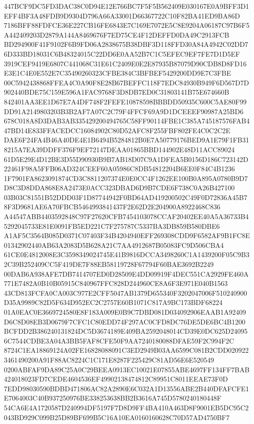 \documentclass[UTF8,fontset=fandol,zihao=-4,a4paper]{ctexart}
\begin{document}
{{447BCF9DC5FD3DAC38C0D94E12E766BC7F5F5B562409E030167E0A9BFF3D1EFF4BF3A48FDB9D9304D796A66A33001D66367722C10F82BA41ED9BA86D
7186BFF88FDFCE36E227CB16FE6843E7C169E7072E5C8E9204A06187C97B6F5A442409203D2879A144A8469676F7ED75CE4F12DEFFD0DA49C2913FCB
BD294900F41F9102F6B9FD06A2838675B38DBF3D118FFD30A84A4942C02DD76D333BD18031C6B48324015C22DD6E0AA52B7C1C5EFEC9EF7FE7D1D5EF
3919CEF9419E6807C441068C31E61C2409E0E2E87935B87079D90CDB8D8FD16E3E1C4E0E552E7C35490260323CFBE384C3BFBEF5429200DD9E7C3FBE
00C5942438868FFEA4C0A90F8E28B67BEFFC118F7EDC84930B949F6D567D7D902440BDE75C159E596A1FAC9768F3D8DB7ED0C31803141B75E674660B
842401AA3EE1D67E7A4DF748F2FEFE10878598BBBDD50935C600C5AE80F99DD91A2149803203B3B2AF7A07C2C79F4FFCF69A9D1DCEEEF90987A25BD6
678C018A8D3DAB3AB335429200494765C58FF90114FBE1C385A745187576FAB447BD14E833FFACEDCC16084902C80D52AFC8F255FBF802FE4C0C2C2E
DAE6F24FA4B46A40DE4E1B6494B5284812B0E7A50779176BED9A1E79F1FB318215A7EA39DDFF376F9EF72147DEAA01865BBD144902E48D11ACC89024
61D5E29E4D12BE3D55D90930B9B7AB18D07C9A1DFEA5B0156D186C723142D22461F98A5FFB06AD324CEEF60A05986C8DB54812204B6EE0F84C4B1236
1F7901FA8623091874CD3C8811207374E0E0CC4F1262EE100B0A895A0780B9D7D8C3D8DDA868E8A2473E0ACC323DBAD6D9B7CDE6F738C0A26B427100
03B03C81551B52DDD03F1D87744942F0BD64AD419200502C49F0D72836A45B78F3D9681AE6A70FBCB5464993841437F2E62D2E204900A8922468C836
A44547ABB4403592848C97F27620CFB7454103078CCAF20402EE40A5A36733B45292045733E81E0091FB5ED221C7F275787C5337BA3DB859B580DBE6
A1AF5C3564B085D0371C07403F34B4204940EFF269308CDD9F6582AF9B1FC8E01342902440AB63A2083D5B628A21C7AA4912687B05083FC9D506CBA4
61CE0E4812008E3C3598349024745E41B9816DCCA3498260C1A1439200F05C9B32C39B252409CC5F419DE7F88EB58119728F67794F60BAE3692B2249
00DAB6A938AFE7DB7414707ED0D28509E4DD09919F4DEC551CA2929FE460A771E7482A0B10B05915C840967FFC828D244960CE8A6F3E971E040B1563
43CD813FCFA0CA003C977E2CFF5047AB1379D655340F3202047006F510240900D35A9989C82D5F634D952EC2C2757E60B1071C817A9BC173BDF68224
01A0EAC0E3669724580E8F183A009E0B9C7DBD081D034092906EAAB1A92409D6C8D08EB3D0679F7CFC1C80EDD74F297AC0CFD8DC76DE5DE6BC4B1200
BCFDD2B386240131824DC5D3674189E409BA2592048014CD39E0DC625D240956C7544CDBE3A04A3BB5FAF8CFE50F9AA7240180088DFAE59F2C994F2C
8724C1EA18869124A02FE16828088091C3ED2949B03AA6599C081B2CDD0209223461490200A91F88AC8224C1C171E8287F225429C81AD56E6E520549
0200ABFAF9DA89C25A0C29BEEA0913EC10021E07855ABE4697FF134FF7BAB424018023FD7CEDE4604536EF49902138474812C89951C8011EEAE73F0D
7EDD98030590BDBD471806AC82A2890E6C032A1D13556ABE2B440DFAFCFE1E7064003C40B937250976BE338253638BB2B3616A745D5780240180448F
54CA6E4A1720587D240994DF5197F7D8D9FF4BA410A463D8F9001EB5DC95C2043BD929C099B25D89BF699B5C16A10EA0160160628C70D57AD4750BF7
}}
\end{document}
